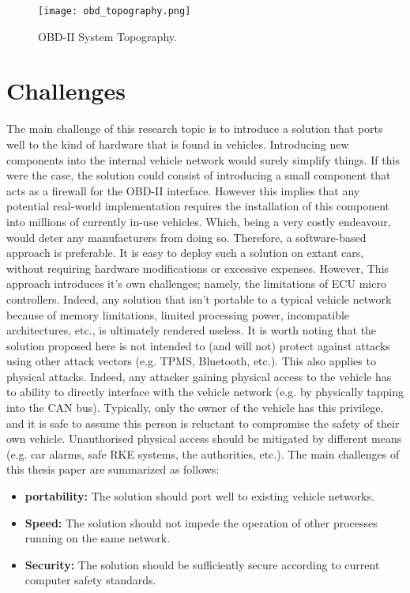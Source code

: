 \begin{figure}[h]
	\label{fig:topography}
	\centering
	\texttt{[image: obd\_topography.png]}
	\caption{OBD-II System Topography.}
\end{figure}
 

\section{Challenges} \label{sec:challenges}
The main challenge of this research topic is to introduce a solution that ports well to the kind of hardware that is found in vehicles. Introducing new components into the internal vehicle network would surely simplify things. If this were the case, the solution could consist of introducing a small component that acts as a firewall for the OBD-II interface. However this implies that any potential real-world implementation requires the installation of this component into millions of currently in-use vehicles. Which, being a very costly endeavour, would deter any manufacturers from doing so. Therefore, a software-based approach is preferable. It is easy to deploy such a solution on extant cars, without requiring hardware modifications or excessive expenses. However, This approach introduces it's own challenges; namely, the limitations of ECU micro controllers. Indeed, any solution that isn't portable to a typical vehicle network because of memory limitations, limited processing power, incompatible architectures, etc., is ultimately rendered useless. It is worth noting that the solution proposed here is not intended to (and will not) protect against attacks using other attack vectors (e.g. TPMS, Bluetooth, etc.). This also applies to physical attacks. Indeed, any attacker gaining physical access to the vehicle has to ability to directly interface with the vehicle network (e.g. by physically tapping into the CAN bus). Typically, only the owner of the vehicle has this privilege, and it is safe to assume this person is reluctant to compromise the safety of their own vehicle. Unauthorised physical access should be mitigated by different means (e.g. car alarms, safe RKE systems, the authorities, etc.). The main challenges of this thesis paper are summarized as follows:

\begin{itemize}
	\item \textbf{portability:} The solution should port well to existing vehicle networks. 
	\item \textbf{Speed:} The solution should not impede the operation of other processes running on the same network.
	\item \textbf{Security:} The solution should be sufficiently secure according to current computer safety standards. 
\end{itemize}

